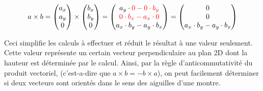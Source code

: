 \documentclass[11pt,french,a4paper,]{article}
\begin{document}
\[
a \times b =
\begin{pmatrix}
a_x \\
a_y \\
0
\end{pmatrix}
\times
\begin{pmatrix}
b_x \\
b_y \\
0
\end{pmatrix} =
\begin{pmatrix}
a_y \cdot \color{red}{0} - \color{red}{0} \cdot b_y \\
\color{red}{0} \cdot b_x - a_x \cdot \color{red}{0} \\
a_x \cdot b_y - a_y \cdot b_x
\end{pmatrix} =
\begin{pmatrix}
0 \\
0 \\
a_x \cdot b_y - a_y \cdot b_x
\end{pmatrix}
\]

Ceci simplifie les calculs à effectuer et réduit le résultat à une
valeur seulement. Cette valeur représente un certain vecteur
perpendiculaire au plan 2D dont la hauteur est déterminée par le calcul.
Ainsi, par la règle d'anticommutativité du produit vectoriel,
(c'est-a-dire que \(a \times b = −b \times a\)), on peut facilement
déterminer si deux vecteurs sont orientés dans le sens des aiguilles
d'une montre.
\end{document}
